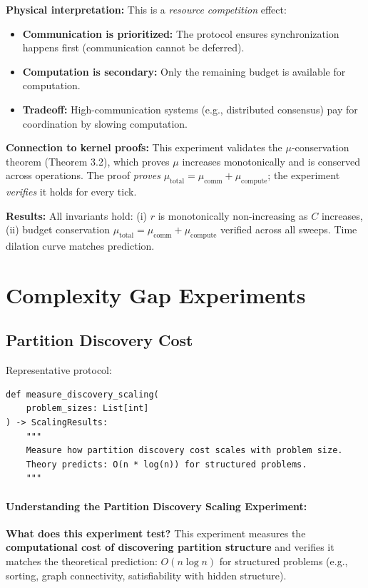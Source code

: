 \textbf{Physical interpretation:} This is a \textit{resource competition} effect:
\begin{itemize}
    \item \textbf{Communication is prioritized:} The protocol ensures synchronization happens first (communication cannot be deferred).
    \item \textbf{Computation is secondary:} Only the remaining budget is available for computation.
    \item \textbf{Tradeoff:} High-communication systems (e.g., distributed consensus) pay for coordination by slowing computation.
\end{itemize}

\textbf{Connection to kernel proofs:} This experiment validates the $\mu$-conservation theorem (Theorem 3.2), which proves $\mu$ increases monotonically and is conserved across operations. The proof \textit{proves} $\mu_{\text{total}} = \mu_{\text{comm}} + \mu_{\text{compute}}$; the experiment \textit{verifies} it holds for every tick.


\textbf{Results:} All invariants hold: (i) $r$ is monotonically non-increasing as $C$ increases, (ii) budget conservation $\mu_{\text{total}} = \mu_{\text{comm}} + \mu_{\text{compute}}$ verified across all sweeps. Time dilation curve matches prediction.

\section{Complexity Gap Experiments}

\subsection{Partition Discovery Cost}

Representative protocol:
\begin{lstlisting}
def measure_discovery_scaling(
    problem_sizes: List[int]
) -> ScalingResults:
    """
    Measure how partition discovery cost scales with problem size.
    Theory predicts: O(n * log(n)) for structured problems.
    """
\end{lstlisting}

\paragraph{Understanding the Partition Discovery Scaling Experiment:}

\textbf{What does this experiment test?} This experiment measures the \textbf{computational cost of discovering partition structure} and verifies it matches the theoretical prediction: $O(n \log n)$ for structured problems (e.g., sorting, graph connectivity, satisfiability with hidden structure).

